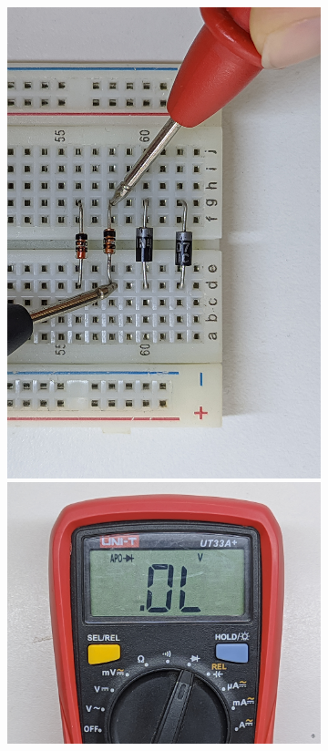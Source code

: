 \documentclass[chaptersright]{informeutn}
\begin{document}
\begin{figure}[!ht]
\begin{subfigure}[b]{1\textwidth}
\begin{minipage}[b]{0.24\textwidth}
        \end{minipage}
        \begin{minipage}[b]{0.24\textwidth}
          \centering
          \includegraphics[angle=-90, width=1\textwidth]{pictures/prot_diod-3i.jpg}
          \includegraphics[width=1\textwidth]{pictures/mult_diod-i.jpg}

\end{minipage}
\end{subfigure}
\end{figure}
\end{document}
